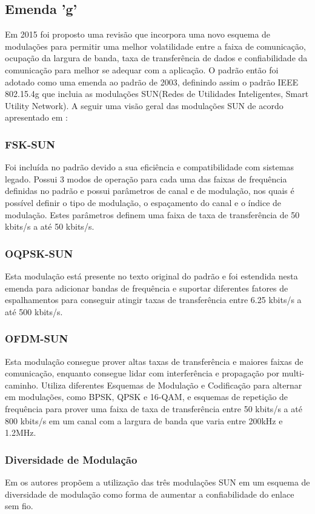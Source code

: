 \subsection*{Emenda 'g'}
Em 2015 foi proposto uma revisão que incorpora uma novo esquema de modulações para permitir uma melhor volatilidade entre a faixa de comunicação, ocupação da largura de banda, taxa de transferência de dados e confiabilidade da comunicação para melhor se adequar com a aplicação. O padrão então foi adotado como uma emenda ao padrão de 2003, definindo assim o padrão IEEE 802.15.4g que incluia as modulações SUN(Redes de Utilidades Inteligentes, Smart Utility Network)\cite{tuset2020reliability}.
A seguir uma visão geral das modulações SUN de acordo apresentado em \cite{tuset2020reliability}:
\subsubsection*{FSK-SUN}
Foi incluída no padrão devido a sua eficiência e compatibilidade com sistemas legado. Possui 3 modos de operação para cada uma das faixas de frequência definidas no padrão e possui parâmetros de canal e de modulação, nos quais é possível definir o tipo de modulação, o espaçamento do canal e o índice de modulação. Estes parâmetros definem uma faixa de taxa de transferência de 50 kbits/s a até 50 kbits/s.
\subsubsection*{OQPSK-SUN}
Esta modulação está presente no texto original do padrão e foi estendida nesta emenda para adicionar bandas de frequência e suportar diferentes fatores de espalhamentos para conseguir atingir taxas de transferência entre 6.25 kbits/s a até 500 kbits/s.
\subsubsection*{OFDM-SUN}
Esta modulação consegue prover altas taxas de transferência e maiores faixas de comunicação, enquanto consegue lidar com interferência e propagação por multi-caminho. Utiliza diferentes Esquemas de Modulação e Codificação para alternar em modulações, como BPSK, QPSK e 16-QAM, e esquemas de repetição de frequência para prover uma faixa de taxa de transferência entre 50 kbits/s a até 800 kbits/s em um canal com a largura de banda que varia entre 200kHz e 1.2MHz.

\subsubsection*{Diversidade de Modulação}
Em \cite{gomes2020improving} os autores propõem a utilização das três modulações SUN em um esquema de diversidade de modulação como forma de aumentar a confiabilidade do enlace sem fio.

